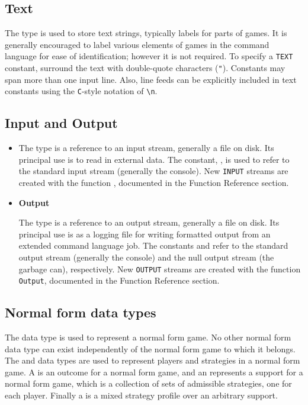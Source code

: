 \subsection{Text}

The  type is used to store text strings, typically labels
for parts of games.  It is generally encouraged to label various
elements of games in the command language for ease of identification;
however it is not required.  To specify a {\tt TEXT} constant,
surround the text with double-quote characters ({\tt "}).  Constants
may span more than one input line.  Also, line feeds can be explicitly
included in text constants using the \verb+C+-style notation of
\verb+\n+. 

\subsection{Input and Output}

\begin{itemize}
\item{}

The  type is a reference to an input stream, generally a
file on disk.  Its principal use is to read in external data.  The
constant, , is used to refer to the standard input stream
(generally the console).  New \verb+INPUT+ streams are created with
the function , documented in the Function Reference
section.

\item {\bf Output}

The  type is a reference to an output stream, generally a
file on disk.  Its principal use is as a logging file for writing
formatted output from an extended command language job.  The
constants  and  refer to the standard
output stream (generally the console) and the null output stream (the
garbage can), respectively.  New \verb+OUTPUT+ streams are created with the 
function \verb+Output+, documented in the Function Reference section.
\end{itemize}

\subsection{Normal form data types}

The data type  is used to represent a normal form game.  No
other normal form data type can exist independently of the normal form
game to which it belongs.  The  and 
data types are used to represent players and strategies in a normal
form game.  A  is an outcome for a normal form game,
and an  represents a support for a normal form
game, which is a collection of sets of admissible strategies, one for
each player.  Finally a  is a mixed strategy profile over
an arbitrary support.

